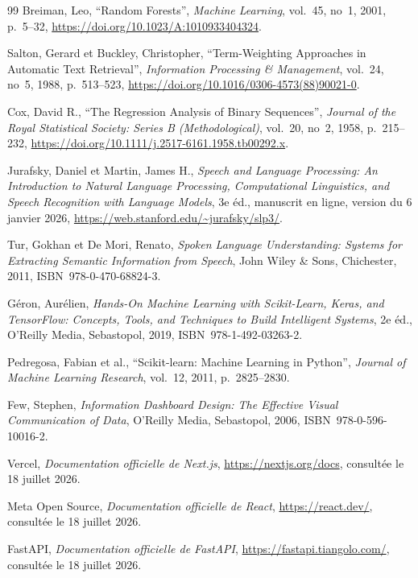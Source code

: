 \documentclass[12pt,a4paper]{report}
\begin{document}
\begin{thebibliography}{99}
Breiman, Leo,
``Random Forests'',
\textit{Machine Learning}, vol.~45, no~1, 2001, p.~5--32,
\url{https://doi.org/10.1023/A:1010933404324}.

Salton, Gerard et Buckley, Christopher,
``Term-Weighting Approaches in Automatic Text Retrieval'',
\textit{Information Processing \& Management}, vol.~24, no~5, 1988, p.~513--523,
\url{https://doi.org/10.1016/0306-4573(88)90021-0}.

Cox, David R.,
``The Regression Analysis of Binary Sequences'',
\textit{Journal of the Royal Statistical Society: Series B (Methodological)}, vol.~20, no~2, 1958, p.~215--232,
\url{https://doi.org/10.1111/j.2517-6161.1958.tb00292.x}.

Jurafsky, Daniel et Martin, James H.,
\textit{Speech and Language Processing: An Introduction to Natural Language Processing, Computational Linguistics, and Speech Recognition with Language Models},
3e éd., manuscrit en ligne, version du 6 janvier 2026,
\url{https://web.stanford.edu/~jurafsky/slp3/}.

Tur, Gokhan et De Mori, Renato,
\textit{Spoken Language Understanding: Systems for Extracting Semantic Information from Speech},
John Wiley \& Sons, Chichester, 2011, ISBN~978-0-470-68824-3.

Géron, Aurélien,
\textit{Hands-On Machine Learning with Scikit-Learn, Keras, and TensorFlow: Concepts, Tools, and Techniques to Build Intelligent Systems},
2e éd., O'Reilly Media, Sebastopol, 2019, ISBN~978-1-492-03263-2.

Pedregosa, Fabian et al.,
``Scikit-learn: Machine Learning in Python'',
\textit{Journal of Machine Learning Research}, vol.~12, 2011, p.~2825--2830.

Few, Stephen,
\textit{Information Dashboard Design: The Effective Visual Communication of Data},
O'Reilly Media, Sebastopol, 2006, ISBN~978-0-596-10016-2.

Vercel,
\textit{Documentation officielle de Next.js},
\url{https://nextjs.org/docs},
consultée le 18 juillet 2026.

Meta Open Source,
\textit{Documentation officielle de React},
\url{https://react.dev/},
consultée le 18 juillet 2026.

FastAPI,
\textit{Documentation officielle de FastAPI},
\url{https://fastapi.tiangolo.com/},
consultée le 18 juillet 2026.


\end{thebibliography}
\end{document}

